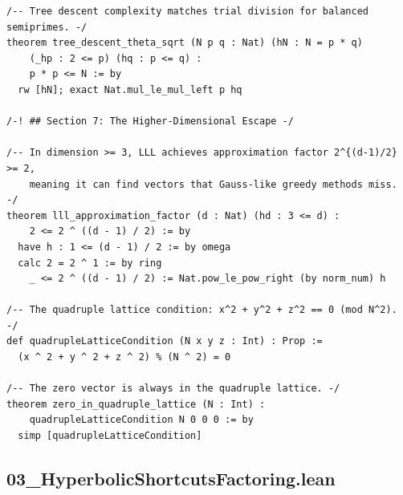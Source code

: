 \documentclass[11pt,openright,twoside]{book}
\theoremstyle{definition}
\begin{document}
\begin{lstlisting}[style=lean]
/-- Tree descent complexity matches trial division for balanced semiprimes. -/
theorem tree_descent_theta_sqrt (N p q : Nat) (hN : N = p * q)
    (_hp : 2 <= p) (hq : p <= q) :
    p * p <= N := by
  rw [hN]; exact Nat.mul_le_mul_left p hq

/-! ## Section 7: The Higher-Dimensional Escape -/

/-- In dimension >= 3, LLL achieves approximation factor 2^{(d-1)/2} >= 2,
    meaning it can find vectors that Gauss-like greedy methods miss. -/
theorem lll_approximation_factor (d : Nat) (hd : 3 <= d) :
    2 <= 2 ^ ((d - 1) / 2) := by
  have h : 1 <= (d - 1) / 2 := by omega
  calc 2 = 2 ^ 1 := by ring
    _ <= 2 ^ ((d - 1) / 2) := Nat.pow_le_pow_right (by norm_num) h

/-- The quadruple lattice condition: x^2 + y^2 + z^2 == 0 (mod N^2). -/
def quadrupleLatticeCondition (N x y z : Int) : Prop :=
  (x ^ 2 + y ^ 2 + z ^ 2) % (N ^ 2) = 0

/-- The zero vector is always in the quadruple lattice. -/
theorem zero_in_quadruple_lattice (N : Int) :
    quadrupleLatticeCondition N 0 0 0 := by
  simp [quadrupleLatticeCondition]

\end{lstlisting}

\clearpage


\subsection*{03\_HyperbolicShortcutsFactoring.lean}
\label{lean:03_HyperbolicShortcutsFactoring}
\end{document}
